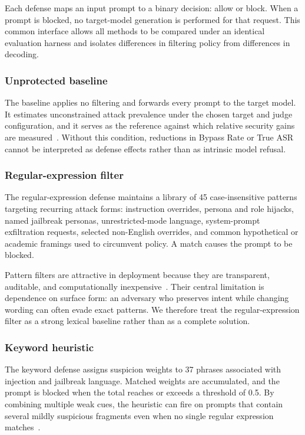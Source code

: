 Each defense maps an input prompt to a binary decision: allow or block.
When a prompt is blocked, no target-model generation is performed for that request.
This common interface allows all methods to be compared under an identical evaluation harness and isolates differences in filtering policy from differences in decoding.

\subsubsection{Unprotected baseline}

The baseline applies no filtering and forwards every prompt to the target model.
It estimates unconstrained attack prevalence under the chosen target and judge configuration, and it serves as the reference against which relative security gains are measured~\cite{zizzo2025adversarial,promptfoo2024owasp}.
Without this condition, reductions in Bypass Rate or True ASR cannot be interpreted as defense effects rather than as intrinsic model refusal.

\subsubsection{Regular-expression filter}

The regular-expression defense maintains a library of 45 case-insensitive patterns targeting recurring attack forms: instruction overrides, persona and role hijacks, named jailbreak personas, unrestricted-mode language, system-prompt exfiltration requests, selected non-English overrides, and common hypothetical or academic framings used to circumvent policy.
A match causes the prompt to be blocked.

Pattern filters are attractive in deployment because they are transparent, auditable, and computationally inexpensive~\cite{owasp_llm,openrouter2026promptinjection}.
Their central limitation is dependence on surface form: an adversary who preserves intent while changing wording can often evade exact patterns.
We therefore treat the regular-expression filter as a strong lexical baseline rather than as a complete solution.

\subsubsection{Keyword heuristic}

The keyword defense assigns suspicion weights to 37 phrases associated with injection and jailbreak language.
Matched weights are accumulated, and the prompt is blocked when the total reaches or exceeds a threshold of 0.5.
By combining multiple weak cues, the heuristic can fire on prompts that contain several mildly suspicious fragments even when no single regular expression matches~\cite{getstream2024prompt,mend2024prompt}.

